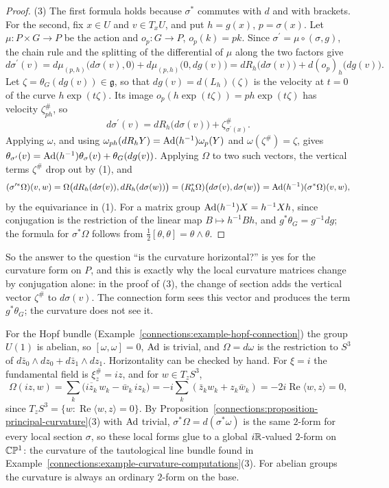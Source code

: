 \begin{proof}
(3) The first formula holds because $\sigma^*$ commutes with $d$ and with brackets. For the second, fix $x \in U$ and $v \in T_xU$, and put $h = g(x)$, $p = \sigma(x)$. Let $\mu \colon P \times G \to P$ be the action
and $o_p \colon G \to P$, $o_p(k) = pk$. Since $\sigma^{\prime} = \mu \circ (\sigma, g)$, the chain rule and the splitting of the differential of $\mu$ along the two factors give
\[
d\sigma^{\prime}(v) = d\mu_{(p, h)}\bigl(d\sigma(v), 0\bigr) + d\mu_{(p, h)}\bigl(0, dg(v)\bigr) = dR_h\bigl(d\sigma(v)\bigr) + d(o_p)_h\bigl(dg(v)\bigr).
\]
Let $\zeta = \theta_G(dg(v)) \in \mathfrak{g}$, so that $dg(v) = d(L_h)(\zeta)$ is the velocity at $t = 0$ of the curve $h\exp(t\zeta)$. Its image $o_p(h\exp(t\zeta)) = ph\exp(t\zeta)$ has velocity
$\zeta^\#_{ph}$, so
\[
d\sigma^{\prime}(v) = dR_h\bigl(d\sigma(v)\bigr) + \zeta^\#_{\sigma^{\prime}(x)} .
\]
Applying $\omega$, and using $\omega_{ph}(dR_hY) = \operatorname{Ad}(h^{-1})\omega_p(Y)$ and $\omega(\zeta^\#) = \zeta$, gives $\theta_{\sigma^{\prime}}(v) = \operatorname{Ad}(h^{-1})\theta_\sigma(v) + \theta_G(dg(v))$. Applying $\Omega$ to two such
vectors, the vertical terms $\zeta^\#$ drop out by (1), and
\[
(\sigma^{\prime*}\Omega)(v, w) = \Omega\bigl(dR_h(d\sigma(v)), dR_h(d\sigma(w))\bigr) = (R_h^*\Omega)\bigl(d\sigma(v), d\sigma(w)\bigr) = \operatorname{Ad}(h^{-1})(\sigma^*\Omega)(v, w),
\]
by the equivariance in (1). For a matrix group $\operatorname{Ad}(h^{-1})X = h^{-1}Xh$, since conjugation is the restriction of the linear map $B \mapsto h^{-1}Bh$, and $g^*\theta_G = g^{-1}dg$; the formula for
$\sigma^*\Omega$ follows from $\frac12[\theta, \theta] = \theta \wedge \theta$.
\end{proof}

So the answer to the question ``is the curvature horizontal?'' is yes for the curvature form on $P$, and this is exactly why the local curvature matrices change by conjugation alone: in the proof of (3), the
change of section adds the vertical vector $\zeta^\#$ to $d\sigma(v)$. The connection form sees this vector and produces the term $g^*\theta_G$; the curvature does not see it.

\begin{example}\label{connections:example-hopf-curvature}
For the Hopf bundle (Example~\ref{connections:example-hopf-connection}) the group $U(1)$ is abelian, so $[\omega, \omega] = 0$, $\operatorname{Ad}$ is trivial, and $\Omega = d\omega$ is the restriction to $S^3$ of
$d\bar z_0 \wedge dz_0 + d\bar z_1 \wedge dz_1$. Horizontality can be checked by hand. For $\xi = i$ the fundamental field is $\xi^\#_z = iz$, and for $w \in T_zS^3$,
\[
\Omega(iz, w) = \sum_k\bigl(\overline{iz_k}\,w_k - \bar w_k\,iz_k\bigr) = -i\sum_k(\bar z_kw_k + z_k\bar w_k) = -2i\operatorname{Re}\langle w, z\rangle = 0,
\]
since $T_zS^3 = \{w : \operatorname{Re}\langle w, z\rangle = 0\}$. By Proposition~\ref{connections:proposition-principal-curvature}(3) with $\operatorname{Ad}$ trivial, $\sigma^*\Omega = d(\sigma^*\omega)$ is the same $2$-form for every
local section $\sigma$, so these local forms glue to a global $i\mathbb{R}$-valued $2$-form on $\mathbb{C}\mathbb{P}^1$: the curvature of the tautological line bundle found in
Example~\ref{connections:example-curvature-computations}(3). For abelian groups the curvature is always an ordinary $2$-form on the base.
\end{example}


